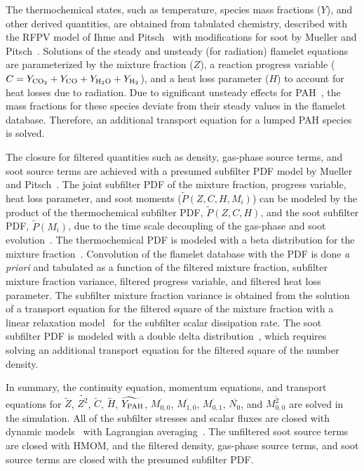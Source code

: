 \documentclass[review,3p,times]{elsarticle}
\begin{document}
The thermochemical states, such as temperature, species mass fractions ($Y$), and other derived quantities, are obtained from tabulated chemistry, described with the RFPV model of Ihme and Pitsch~\cite{ihme08} with modifications for soot by Mueller and Pitsch~\cite{mueller12}.  Solutions of the steady and unsteady (for radiation) flamelet equations are parameterized by the mixture fraction ($Z$), a reaction progress variable ($C = Y_{\rm CO_2} + Y_{\rm CO} + Y_{\rm H_2O} + Y_{\rm H_2}$), and a heat loss parameter ($H$) to account for heat losses due to radiation.  Due to significant unsteady effects for PAH~\cite{bisetti12}, the mass fractions for these species deviate from their steady values in the flamelet database.  Therefore, an additional transport equation for a lumped PAH species is solved.

The closure for filtered quantities such as density, gas-phase source terms, and soot source terms are achieved with a presumed subfilter PDF model by Mueller and Pitsch~\cite{mueller12, mueller11b}.  The joint subfilter PDF of the mixture fraction, progress variable, heat loss parameter, and soot moments ($\widetilde{P}\left(Z,C,H,M_i\right)$) can be modeled by the product of the thermochemical subfilter PDF, $\widetilde{P}\left(Z,C,H\right)$, and the soot subfilter PDF, $\widetilde{P}\left(M_i\right)$, due to the time scale decoupling of the gas-phase and soot evolution~\cite{mueller11b}.  The thermochemical PDF is modeled with a beta distribution for the mixture fraction~\cite{cook94}.  Convolution of the flamelet database with the PDF is done \emph{a priori} and tabulated as a function of the filtered mixture fraction, subfilter mixture fraction variance, filtered progress variable, and filtered heat loss parameter.  The subfilter mixture fraction variance is obtained from the solution of a transport equation for the filtered square of the mixture fraction with a linear relaxation model~\cite{ihme08b} for the subfilter scalar dissipation rate.  The soot subfilter PDF is modeled with a double delta distribution~\cite{mueller11b}, which requires solving an additional transport equation for the filtered square of the number density.

In summary, the continuity equation, momentum equations, and transport equations for $\widetilde{Z}$, $\widetilde{Z^2}$, $\widetilde{C}$, $\widetilde{H}$, $\widetilde{Y_{\rm PAH}}$, $\overline{M_{0,0}}$, $\overline{M_{1,0}}$, $\overline{M_{0,1}}$, $\overline{N_0}$, and $\overline{M^2_{0,0}}$ are solved in the simulation.  All of the subfilter stresses and scalar fluxes are closed with dynamic models~\cite{germano91} with Lagrangian averaging~\cite{meneveau96}.  The unfiltered soot source terms are closed with HMOM, and the filtered density, gas-phase source terms, and soot source terms are closed with the presumed subfilter PDF.  
\end{document}
